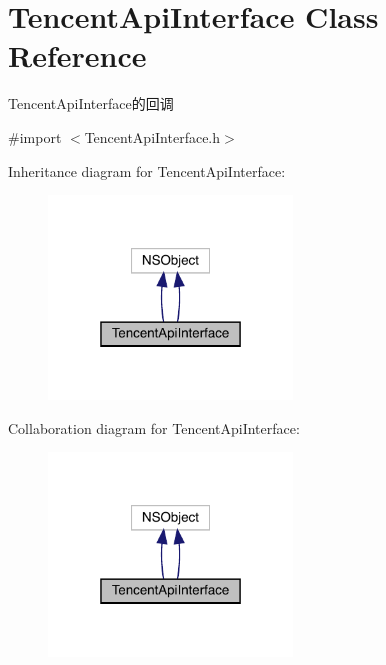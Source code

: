 \hypertarget{interface_tencent_api_interface}{}\section{Tencent\+Api\+Interface Class Reference}
\label{interface_tencent_api_interface}


Tencent\+Api\+Interface的回调  




{\ttfamily \#import $<$Tencent\+Api\+Interface.\+h$>$}



Inheritance diagram for Tencent\+Api\+Interface\+:\nopagebreak
\begin{figure}[H]
\begin{center}
\leavevmode
\includegraphics[width=184pt]{interface_tencent_api_interface__inherit__graph}
\end{center}
\end{figure}


Collaboration diagram for Tencent\+Api\+Interface\+:\nopagebreak
\begin{figure}[H]
\begin{center}
\leavevmode
\includegraphics[width=184pt]{interface_tencent_api_interface__coll__graph}
\end{center}
\end{figure}
